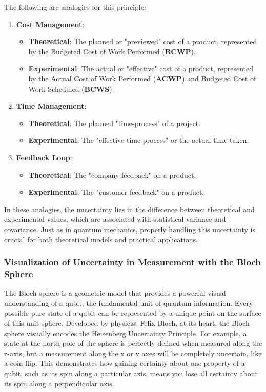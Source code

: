 \documentclass{article}
\begin{document}
 The following are analogies for this principle:
 \begin{enumerate}
 	\item \textbf{Cost Management}:
 	\begin{itemize}
 		\item \textbf{Theoretical}: The planned or "previewed" cost of a product, represented by the Budgeted Cost of Work Performed (\textbf{BCWP}).
 		\item \textbf{Experimental}: The actual or "effective" cost of a product, represented by the Actual Cost of Work Performed (\textbf{ACWP}) and Budgeted Cost of Work Scheduled (\textbf{BCWS}).
 	\end{itemize}
 	\item \textbf{Time Management}:
 	\begin{itemize}
 		\item \textbf{Theoretical}: The planned "time-process" of a project.
 		\item \textbf{Experimental}: The "effective time-process" or the actual time taken.
 	\end{itemize}
 	\item \textbf{Feedback Loop}:
 	\begin{itemize}
 		\item \textbf{Theoretical}: The "company feedback" on a product.
 		\item \textbf{Experimental}: The "customer feedback" on a product.
 	\end{itemize}
 \end{enumerate}
 In these analogies, the uncertainty lies in the difference between theoretical and experimental values, which are associated with statistical variance and covariance. Just as in quantum mechanics, properly handling this uncertainty is crucial for both theoretical models and practical applications.

 
 \subsubsection*{Visualization of Uncertainty in Measurement with the Bloch Sphere}
The Bloch sphere is a geometric model that provides a powerful visual understanding of a qubit, the fundamental unit of quantum information. Every possible pure state of a qubit can be represented by a unique point on the surface of this unit sphere. Developed by physicist Felix Bloch, at its heart, the Bloch sphere visually encodes the Heisenberg Uncertainty Principle. For example, a state at the north pole of the sphere is perfectly defined when measured along the z-axis, but a measurement along the x or y axes will be completely uncertain, like a coin flip. This demonstrates how gaining certainty about one property of a qubit, such as its spin along a particular axis, means you lose all certainty about its spin along a perpendicular axis. 
 
\end{document}
